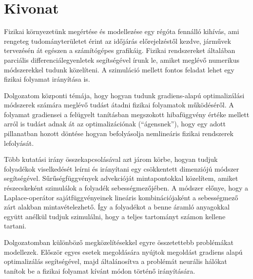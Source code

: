 \setcounter{page}{1}

\selecthungarian

\chapter*{Kivonat}

Fizikai környezetünk megértése és modellezése egy régóta fennálló kihívás, ami
rengeteg tudományterületet érint az időjárás előrejelzéstől kezdve, járművek
tervezésén át egészen a számítógépes grafikáig. Fizikai rendszereket általában
parciális differenciálegyenletek segítségével írunk le, amiket meglévő numerikus
módszerekkel tudunk közelíteni. A szimuláció mellett fontos feladat lehet egy
fizikai folyamat irányítása is.  

Dolgozatom központi témája, hogy hogyan tudunk gradiens-alapú optimalizálási
módszerek számára meglévő tudást átadni fizikai folyamatok működéséről.
A folyamat gradiensei a felügyelt tanításban megszokott hibafüggvény értéke
mellett arról is tudást adnak át az optimalizációnak (``ágensnek''), hogy egy
adott pillanatban hozott döntése hogyan befolyásolja nemlineáris fizikai
rendszerek lefolyását.

Több kutatási irány összekapcsolásával azt járom körbe, hogyan tudjuk folyadékok
viselkedését leírni és irányítani egy csökkentett dimenziójú módszer
segítségével. Sűrűségfüggvények advekcióját mintapontokkal közelítem, amiket
részecskeként szimulálok a folyadék sebességmezőjében. A módszer előnye, hogy
a Laplace-operátor sajátfüggvényeinek lineáris kombinációjaként  a sebességmező
zárt alakban mintavételezhető. Így a folyadékot a benne áramló anyagokkal
együtt  anélkül tudjuk szimulálni, hogy a teljes tartományt számon kellene
tartani.

Dolgozatomban különböző megközelítésekkel egyre összetettebb problémákat
modellezek. Először egyes esetek megoldására nyújtok megoldást gradiens alapú
optimalizálás segítségével, majd általánosítva a problémát neurális hálókat
tanítok be a fizikai folyamat kívánt módon történő irányítására.

\vfill
\selectenglish

